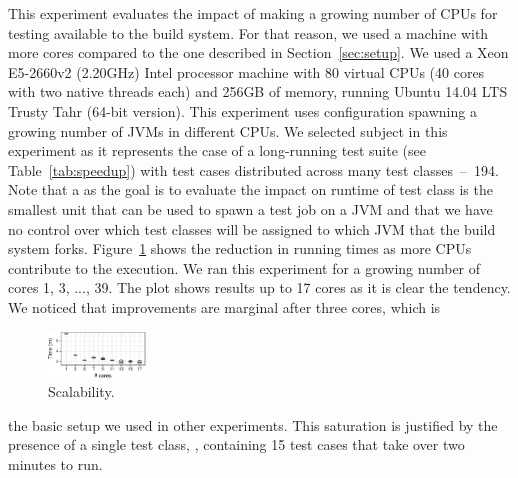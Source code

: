 This experiment evaluates the impact of making a growing number of
CPUs for testing available to the build system.  For that reason, we
used a machine with more cores compared to the one described in
Section~\ref{sec:setup}.  We used a Xeon E5-2660v2 (2.20GHz) Intel
processor machine with 80 virtual CPUs (40 cores with two native
threads each) and 256GB of memory, running Ubuntu 14.04 LTS Trusty
Tahr (64-bit version). This experiment uses configuration
spawning a growing number of JVMs in different CPUs.  We selected
subject \subjectScalability{} in this experiment as it represents the
case of a long-running test suite (see Table~\ref{tab:speedup}) with
test cases distributed across many test classes~--~194.  Note that a
\emph{\ForkSeq{}} as the goal is to evaluate the impact on runtime of
test class is the smallest unit that can be used to spawn a test job
on a JVM and that we have no control over which test classes will be
assigned to which JVM that the build system forks.
Figure~\ref{fig:scalability} shows the reduction in running times as
more CPUs contribute to the execution.
We ran this experiment for a growing number of cores 1, 3, ..., 39. 
The plot shows results up to 17 cores as it is clear the tendency.
We noticed that improvements are marginal after three cores, which is
\begin{figure}
  \vspace{-1ex}
  \includegraphics[width=0.23\textwidth]{R/scalability/scalability.pdf}
  \caption{\label{fig:scalability}Scalability.}
  \vspace{-2ex}
\end{figure}
the basic setup we used in other experiments.
This saturation is justified by the presence of a single test class,
, containing 15 test cases that take over
two minutes to run.

\begin{center}
\vspace{1ex}
\end{center}

